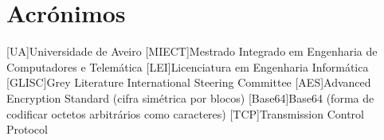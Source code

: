 \documentclass{report}
\begin{document}
\chapter*{Acrónimos}
\begin{acronym}
[UA]{Universidade de Aveiro}
[MIECT]{Mestrado Integrado em Engenharia de Computadores e Telemática}
[LEI]{Licenciatura em Engenharia Informática}
[GLISC]{Grey Literature International Steering Committee}
[AES]{Advanced Encryption Standard (cifra simétrica por blocos)}
[Base64]{Base64 (forma de codificar octetos arbitrários como caracteres)}
[TCP]{Transmission Control Protocol}
\end{acronym}

\printbibliography
\end{document}
